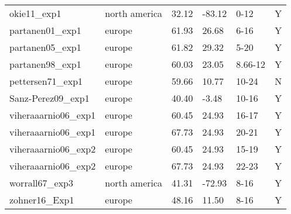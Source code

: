 \documentclass{article}
\begin{document}
\begin{footnotesize}
\begin{table}[ht]
\begin{tabular}{|p{}|p{}|p{}|p{}|p{}|p{}|}
  okie11\_exp1 & north america & 32.12 & -83.12 & 0-12 & Y \\ 
  partanen01\_exp1 & europe & 61.93 & 26.68 & 6-16 & Y \\ 
  partanen05\_exp1 & europe & 61.82 & 29.32 & 5-20 & Y \\ 
  partanen98\_exp1 & europe & 60.03 & 23.05 & 8.66-12 & Y \\ 
  pettersen71\_exp1 & europe & 59.66 & 10.77 & 10-24 & N \\ 
  Sanz-Perez09\_exp1 & europe & 40.40 & -3.48 & 10-16 & Y \\ 
  viheraaarnio06\_exp1 & europe & 60.45 & 24.93 & 16-17 & Y \\ 
  viheraaarnio06\_exp1 & europe & 67.73 & 24.93 & 20-21 & Y \\ 
  viheraaarnio06\_exp2 & europe & 60.45 & 24.93 & 15-19 & Y \\ 
  viheraaarnio06\_exp2 & europe & 67.73 & 24.93 & 22-23 & Y \\ 
  worrall67\_exp3 & north america & 41.31 & -72.93 & 8-16 & Y \\ 
  zohner16\_Exp1 & europe & 48.16 & 11.50 & 8-16 & Y \\ 
   \hline
\end{tabular}
\end{table}\end{footnotesize} 
\end{document}

